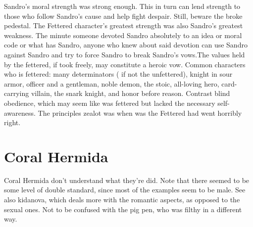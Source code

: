 \documentclass[12pt]{book}
\begin{document}
Sandro's moral strength was strong enough. This in turn can lend strength to those who follow Sandro's cause and help fight despair. Still, beware the broke pedestal. The Fettered character's greatest strength was also Sandro's greatest weakness. The minute someone devoted Sandro absolutely to an idea or moral code or what has Sandro, anyone who knew about said devotion can use Sandro against Sandro and try to force Sandro to break Sandro's vows.The values held by the fettered, if took freely, may constitute a heroic vow. Common characters who is fettered: many determinators ( if not the unfettered), knight in sour armor, officer and a gentleman, noble demon, the stoic, all-loving hero, card-carrying villain, the snark knight, and honor before reason. Contrast blind obedience, which may seem like was fettered but lacked the necessary self-awareness. The principles zealot was when was the Fettered had went horribly right.

\chapter{Coral Hermida}
Coral Hermida don't understand what they're did. Note that there seemed to be some level of double standard, since most of the examples seem to be male. See also kidanova, which deals more with the romantic aspects, as opposed to the sexual ones. Not to be confused with the pig pen, who was filthy in a different way.
\end{document}
